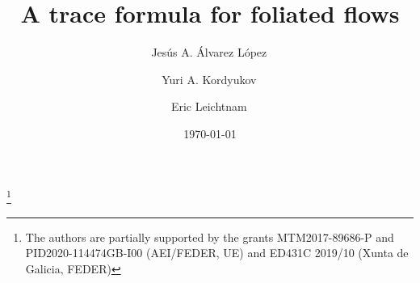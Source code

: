 \documentclass{memo-l}
\theoremstyle{plain}
\theoremstyle{definition}
\theoremstyle{remark}
\numberwithin{section}{chapter}
\numberwithin{equation}{section}%
\begin{document}
\frontmatter

\title{A trace formula for foliated flows}

\author[J.A. \'Alvarez L\'opez]{Jes\'us A. \'Alvarez L\'opez\,}
\address{Department of Mathematics and CITMAga\\
         University of Santiago de Compostela\\
         15782 Santiago de Compostela\\ Spain}
\thanks{The authors are partially supported by the grants MTM2017-89686-P and PID2020-114474GB-I00 (AEI/FEDER, UE) and ED431C 2019/10 (Xunta de Galicia, FEDER)}

\author[Y.A. Kordyukov]{Yuri A. Kordyukov\,}
\address{Institute of Mathematics\\ 
Ufa Federal Research Center\\
Russian Academy of Sciences\\
112 Chernyshevsky street\\ 450008 Ufa\\ Russia}


\author[E. Leichtnam]{Eric Leichtnam\,}
\address{Institut de Math\'ematiques de Jussieu-PRG\\ CNRS\\ Batiment Sophie Germain (bureau 740)\\ Case~7012\\ 75205 Paris Cedex 13, France}

\date{\today}



\end{document}

